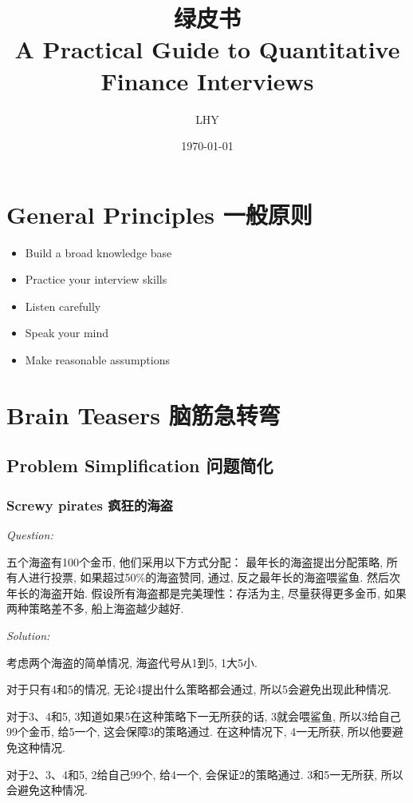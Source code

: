 \documentclass[12pt]{book}
\title{绿皮书 \\ A Practical Guide to Quantitative Finance Interviews}
\author{LHY}
\date{\today}
\begin{document}
\maketitle

\frontmatter %
\tableofcontents

\mainmatter %

\chapter{General Principles 一般原则}
\begin{itemize}
  \item Build a broad knowledge base
  \item Practice your interview skills
  \item Listen carefully
  \item Speak your mind
  \item Make reasonable assumptions
\end{itemize}

\chapter{Brain Teasers 脑筋急转弯}
\section{Problem Simplification 问题简化}
\subsection{Screwy pirates 疯狂的海盗}
\noindent \textit{Question:}

五个海盗有100个金币, 他们采用以下方式分配：
最年长的海盗提出分配策略, 所有人进行投票, 如果超过50\%的海盗赞同, 通过, 反之最年长的海盗喂鲨鱼. 然后次年长的海盗开始. 假设所有海盗都是完美理性：存活为主, 尽量获得更多金币, 如果两种策略差不多, 船上海盗越少越好. 

\noindent \textit{Solution:} 

考虑两个海盗的简单情况, 海盗代号从1到5, 1大5小. 

对于只有4和5的情况, 无论4提出什么策略都会通过, 所以5会避免出现此种情况. 

对于3、4和5, 3知道如果5在这种策略下一无所获的话, 3就会喂鲨鱼, 所以3给自己99个金币, 给5一个, 这会保障3的策略通过. 在这种情况下, 4一无所获, 所以他要避免这种情况. 

对于2、3、4和5, 2给自己99个, 给4一个, 会保证2的策略通过. 3和5一无所获, 所以会避免这种情况. 
\end{document}
